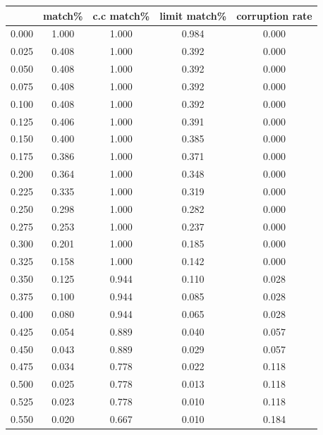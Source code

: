 \documentclass{article}
\begin{document}
\begin{table}[H]
  \centering
  \begin{tabular}{
  >{\columncolor[HTML]{FFE599}}c 
  >{\columncolor[HTML]{B6D7A8}}c 
  >{\columncolor[HTML]{9FC5E8}}c 
  >{\columncolor[HTML]{F9CB9C}}c 
  >{\columncolor[HTML]{D9D2E9}}c }
  \cline{1-1}
  \multicolumn{1}{|c|}{\cellcolor[HTML]{F1C232}threshold} &
    \cellcolor[HTML]{6AA84F}match\% &
    \cellcolor[HTML]{3C78D8}c.c match\% &
    \cellcolor[HTML]{E69138}limit match\% &
    \cellcolor[HTML]{8E7CC3}corruption rate \\ \cline{1-1}
  0.000 & 1.000 & 1.000 & 0.984 & 0.000 \\
  0.025 & 0.408 & 1.000 & 0.392 & 0.000 \\
  0.050 & 0.408 & 1.000 & 0.392 & 0.000 \\
  0.075 & 0.408 & 1.000 & 0.392 & 0.000 \\
  0.100 & 0.408 & 1.000 & 0.392 & 0.000 \\
  0.125 & 0.406 & 1.000 & 0.391 & 0.000 \\
  0.150 & 0.400 & 1.000 & 0.385 & 0.000 \\
  0.175 & 0.386 & 1.000 & 0.371 & 0.000 \\
  0.200 & 0.364 & 1.000 & 0.348 & 0.000 \\
  0.225 & 0.335 & 1.000 & 0.319 & 0.000 \\
  0.250 & 0.298 & 1.000 & 0.282 & 0.000 \\
  0.275 & 0.253 & 1.000 & 0.237 & 0.000 \\
  0.300 & 0.201 & 1.000 & 0.185 & 0.000 \\
  0.325 & 0.158 & 1.000 & 0.142 & 0.000 \\
  0.350 & 0.125 & 0.944 & 0.110 & 0.028 \\
  0.375 & 0.100 & 0.944 & 0.085 & 0.028 \\
  0.400 & 0.080 & 0.944 & 0.065 & 0.028 \\
  \cellcolor[HTML]{FF0000}0.425 &
    \cellcolor[HTML]{FF0000}0.054 &
    \cellcolor[HTML]{FF0000}0.889 &
    \cellcolor[HTML]{FF0000}0.040 &
    \cellcolor[HTML]{FF0000}0.057 \\
  0.450 & 0.043 & 0.889 & 0.029 & 0.057 \\
  0.475 & 0.034 & 0.778 & 0.022 & 0.118 \\
  0.500 & 0.025 & 0.778 & 0.013 & 0.118 \\
  0.525 & 0.023 & 0.778 & 0.010 & 0.118 \\
  0.550 & 0.020 & 0.667 & 0.010 & 0.184 \\

\end{tabular}
\end{table}
\end{document}
